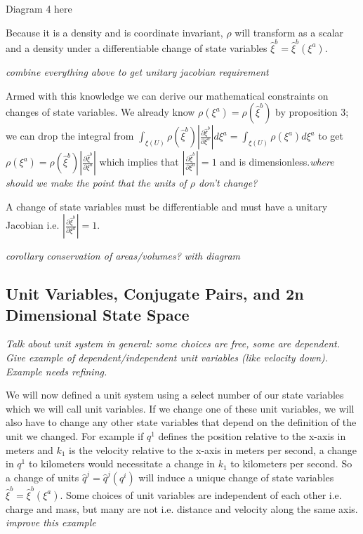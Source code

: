 \documentclass{article}
\begin{document}
Diagram 4 here 

\begin{prop}
	Because it is a density and is coordinate invariant, $\rho$ will transform as a scalar and a density under a differentiable change of state variables $\hat{\xi}^b = \hat{\xi}^b(\xi^a)$.
\end{prop}

	\emph{combine everything above to get unitary jacobian requirement}

	Armed with this knowledge we can derive our mathematical constraints on changes of state variables. We already know $\rho(\xi^a) = \rho(\hat{\xi}^b)$ by proposition 3; we can drop the integral from $\int_{\xi(U)} \rho(\hat{\xi}^b)\left|\frac{\partial\hat{\xi}^b}{\partial\xi^a}\right|d\xi^a = \int_{\xi(U)} \rho(\xi^a)d\xi^a$ to get $\rho(\xi^a) = \rho(\hat{\xi}^b)\left|\frac{\partial\hat{\xi}^b}{\partial\xi^a}\right|$ which implies that $\left|\frac{\partial\hat{\xi}^b}{\partial\xi^a}\right| = 1$ and is dimensionless.\emph{where should we make the point that the units of $\rho$ don't change?}
		
\begin{prop}
	A change of state variables must be differentiable and must have a unitary Jacobian i.e. $\left|\frac{\partial\hat{\xi}^b}{\partial\xi^a}\right| = 1$.
\end{prop}

\emph{corollary conservation of areas/volumes? with diagram}

\subsection{Unit Variables, Conjugate Pairs, and 2n Dimensional State Space}

\emph{Talk about unit system in general: some choices are free, some are dependent. Give example of dependent/independent unit variables (like velocity down). Example needs refining.}

	We will now defined a unit system using a select number of our state variables which we will call unit variables. If we change one of these unit variables, we will also have to change any other state variables that depend on the definition of the unit we changed. For example if $q^1$ defines the position relative to the x-axis in meters and $k_1$ is the velocity relative to the x-axis in meters per second, a change in $q^1$ to kilometers would necessitate a change in $k_1$ to kilometers per second. So a change of units $\hat{q}^j = \hat{q}^j(q^i)$ will induce a unique change of state variables $\hat{\xi}^b = \hat{\xi}^b(\xi^a)$. Some choices of unit variables are independent of each other i.e. charge and mass, but many are not i.e. distance and velocity along the same axis. \emph{improve this example}
\end{document}
